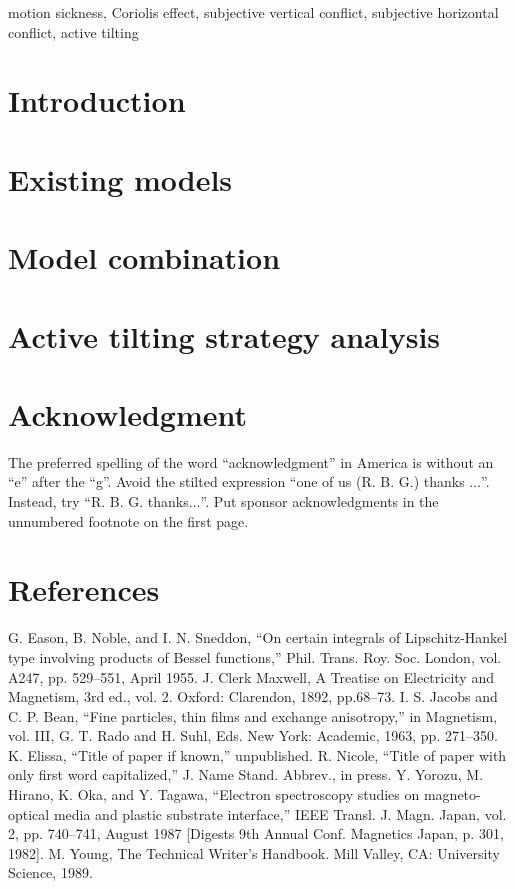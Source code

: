 \documentclass[conference]{IEEEtran}
\begin{document}
\begin{IEEEkeywords}
	motion sickness, Coriolis effect, subjective vertical conflict, subjective horizontal conflict, active tilting
\end{IEEEkeywords}

\section{Introduction}

\section{Existing models}

\section{Model combination}

\section{Active tilting strategy analysis}

\section*{Acknowledgment}

The preferred spelling of the word ``acknowledgment'' in America is without 
an ``e'' after the ``g''. Avoid the stilted expression ``one of us (R. B. 
G.) thanks $\ldots$''. Instead, try ``R. B. G. thanks$\ldots$''. Put sponsor 
acknowledgments in the unnumbered footnote on the first page.

\section*{References}

\begin{thebibliography}{00}
 G. Eason, B. Noble, and I. N. Sneddon, ``On certain integrals of Lipschitz-Hankel type involving products of Bessel functions,'' Phil. Trans. Roy. Soc. London, vol. A247, pp. 529--551, April 1955.
 J. Clerk Maxwell, A Treatise on Electricity and Magnetism, 3rd ed., vol. 2. Oxford: Clarendon, 1892, pp.68--73.
 I. S. Jacobs and C. P. Bean, ``Fine particles, thin films and exchange anisotropy,'' in Magnetism, vol. III, G. T. Rado and H. Suhl, Eds. New York: Academic, 1963, pp. 271--350.
 K. Elissa, ``Title of paper if known,'' unpublished.
 R. Nicole, ``Title of paper with only first word capitalized,'' J. Name Stand. Abbrev., in press.
 Y. Yorozu, M. Hirano, K. Oka, and Y. Tagawa, ``Electron spectroscopy studies on magneto-optical media and plastic substrate interface,'' IEEE Transl. J. Magn. Japan, vol. 2, pp. 740--741, August 1987 [Digests 9th Annual Conf. Magnetics Japan, p. 301, 1982].
 M. Young, The Technical Writer's Handbook. Mill Valley, CA: University Science, 1989.
\end{thebibliography}
\end{document}
